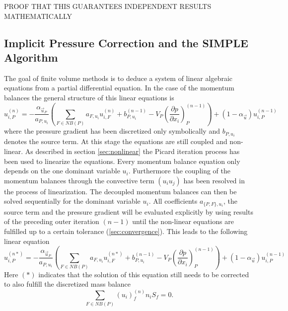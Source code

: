   PROOF THAT THIS GUARANTEES INDEPENDENT RESULTS MATHEMATICALLY

  \subsection{Implicit Pressure Correction and the SIMPLE Algorithm}
  \label{sec:simple}
  
  The goal of finite volume methods is to deduce a system of linear algebraic equations from a partial differential equation. In the case of the momentum balances the general structure of this linear equations is
  \begin{equation}
    \label{eq:linfinal}
    u_{i,P}^{(n)} 
    = 
    - \frac{\alpha_{\vec{u}_P}}{a_{P,u_i}} \left(\sum_{F \in NB(P)} a_{F,u_i} u_{i,F}^{(n)}
    +                                     b_{P,u_i}^{(n-1)} 
    -                                     V_P\left(\frac{\partial p}{\partial x_i}\right)_P^{(n-1)} \right)
    + \left(1 - \alpha_{\vec{u}}\right) u_{i,P}^{(n-1)}  
  \end{equation}
  where the pressure gradient has been discretized only symbolically and \(b_{P,u_i}\) denotes the source term. At this stage the equations are still coupled and non-linear. As described in section \ref{sec:nonlinear} the Picard iteration process has been used to linearize the equations. Every momentum balance equation only depends on the one dominant variable \(u_i\). Furthermore the coupling of the momentum balances through the convective term \((u_i u_j)\) has been resolved in the process of linearization. The decoupled momentum balances can then be solved sequentially for the dominant variable \(u_i\). All coefficients \(a_{\{P,F\},u_i}\), the source term and the pressure gradient will be evaluated explicitly by using results of the preceding outer iteration \((n-1)\) until the non-linear equations are fulfilled up to a certain tolerance (\ref{sec:convergence}). This leads to the following linear equation 
  \begin{equation}
    \label{eq:nodeinter}
    u_{i,P}^{(n*)} 
    = 
    - \frac{\alpha_{\vec{u}_P}}{a_{P,u_i}} \left(\sum_{F \in NB(P)} a_{F,u_i} u_{i,F}^{(n*)}
    +                                     b_{P,u_i}^{(n-1)} 
    -                                     V_P\left(\frac{\partial p}{\partial x_i}\right)_P^{(n-1)} \right)
    + \left(1 - \alpha_{\vec{u}}\right) u_{i,P}^{(n-1)}  
\end{equation}
Here \((*)\) indicates that the solution of this equation still needs to be corrected to also fulfill the discretized mass balance
  \begin{equation}
    \label{eq:contisemi}
    \sum_{F \in NB(P)} \left(u_i\right)^{(n)}_f n_i S_f = 0.
  \end{equation}

